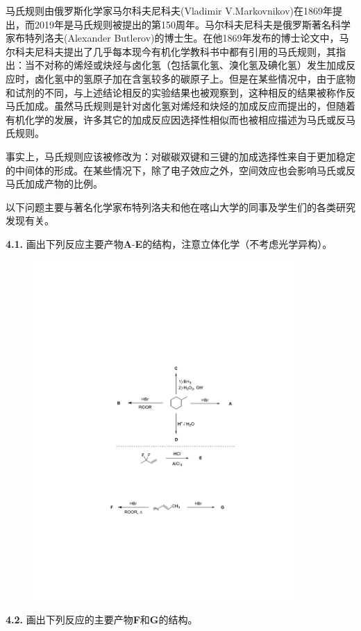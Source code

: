 马氏规则由俄罗斯化学家马尔科夫尼科夫(Vladimir V.Markovnikov)在1869年提出，而2019年是马氏规则被提出的第150周年。马尔科夫尼科夫是俄罗斯著名科学家布特列洛夫(Alexander Butlerov)的博士生。在他1869年发布的博士论文中，马尔科夫尼科夫提出了几乎每本现今有机化学教科书中都有引用的马氏规则，其指出：当不对称的烯烃或炔烃与卤化氢（包括氯化氢、溴化氢及碘化氢）发生加成反应时，卤化氢中的氢原子加在含氢较多的碳原子上。但是在某些情况中，由于底物和试剂的不同，与上述结论相反的实验结果也被观察到，这种相反的结果被称作反马氏加成。虽然马氏规则是针对卤化氢对烯烃和炔烃的加成反应而提出的，但随着有机化学的发展，许多其它的加成反应因选择性相似而也被相应描述为马氏或反马氏规则。

事实上，马氏规则应该被修改为：对碳碳双键和三键的加成选择性来自于更加稳定的中间体的形成。在某些情况下，除了电子效应之外，空间效应也会影响马氏或反马氏加成产物的比例。

以下问题主要与著名化学家布特列洛夫和他在喀山大学的同事及学生们的各类研究发现有关。

\noindent\textbf{4.1.}
画出下列反应主要产物\textbf{A}-\textbf{E}的结构，注意立体化学（不考虑光学异构）。

\begin{figure}[h]
	\centering
	\includegraphics[width=10cm]{./pic/t4-2.pdf}
\end{figure}

\noindent\textbf{4.2.} 画出下列反应的主要产物\textbf{F}和\textbf{G}的结构。

